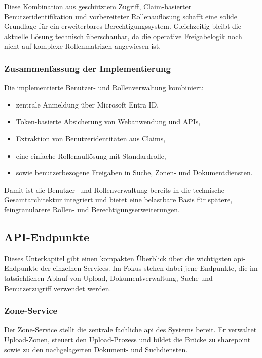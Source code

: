 Diese Kombination aus geschütztem Zugriff, Claim-basierter
Benutzeridentifikation und vorbereiteter Rollenauflösung schafft eine solide
Grundlage für ein erweiterbares Berechtigungssystem. Gleichzeitig bleibt die
aktuelle Lösung technisch überschaubar, da die operative Freigabelogik noch
nicht auf komplexe Rollenmatrizen angewiesen ist.

\subsubsection{Zusammenfassung der Implementierung}

Die implementierte Benutzer- und Rollenverwaltung kombiniert:
\begin{itemize}
    \item zentrale Anmeldung über Microsoft Entra ID,
    \item Token-basierte Absicherung von Webanwendung und APIs,
    \item Extraktion von Benutzeridentitäten aus Claims,
    \item eine einfache Rollenauflösung mit Standardrolle,
    \item sowie benutzerbezogene Freigaben in Suche, Zonen- und Dokumentdiensten.
\end{itemize}

Damit ist die Benutzer- und Rollenverwaltung bereits in die technische
Gesamtarchitektur integriert und bietet eine belastbare Basis für spätere,
feingranularere Rollen- und Berechtigungserweiterungen.

\subsection{API-Endpunkte}\label{subsec:api_endpunkte}

Dieses Unterkapitel gibt einen kompakten Überblick über die wichtigsten
\acrshort{api}-Endpunkte der einzelnen Services. Im Fokus stehen dabei jene Endpunkte, die
im tatsächlichen Ablauf von Upload, Dokumentverwaltung, Suche und
Benutzerzugriff verwendet werden.

\subsubsection{Zone-Service}

Der Zone-Service stellt die zentrale fachliche \acrshort{api} des Systems bereit. Er
verwaltet Upload-Zonen, steuert den Upload-Prozess und bildet die Brücke zu
\gls{sharepoint} sowie zu den nachgelagerten Dokument- und Suchdiensten.

